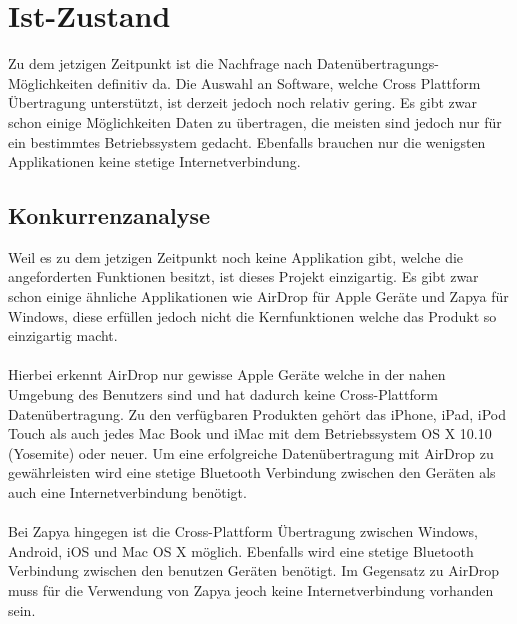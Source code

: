 \section{Ist-Zustand}
Zu dem jetzigen Zeitpunkt ist die Nachfrage nach Datenübertragungs-Möglichkeiten definitiv da. Die Auswahl an Software, welche Cross Plattform Übertragung unterstützt, ist derzeit jedoch noch relativ gering. Es gibt zwar schon einige Möglichkeiten Daten zu übertragen, die meisten sind jedoch nur für ein bestimmtes Betriebssystem gedacht. Ebenfalls brauchen nur die wenigsten Applikationen keine stetige Internetverbindung.
\subsection*{Konkurrenzanalyse}
Weil es zu dem jetzigen Zeitpunkt noch keine Applikation gibt, welche die angeforderten Funktionen besitzt, ist dieses Projekt einzigartig. Es gibt zwar schon einige ähnliche Applikationen wie AirDrop für Apple Geräte und Zapya für Windows, diese erfüllen jedoch nicht die  Kernfunktionen welche das Produkt so einzigartig macht.\\\\
Hierbei erkennt AirDrop nur gewisse Apple Geräte welche in der nahen Umgebung des Benutzers sind  und hat dadurch keine Cross-Plattform Datenübertragung. Zu den verfügbaren Produkten gehört das iPhone, iPad, iPod Touch als auch jedes Mac Book und iMac mit dem Betriebssystem OS X 10.10 (Yosemite) oder neuer. Um eine erfolgreiche Datenübertragung mit AirDrop zu gewährleisten wird eine stetige Bluetooth Verbindung zwischen den Geräten als auch eine Internetverbindung benötigt.\\\\
Bei Zapya hingegen ist die Cross-Plattform Übertragung zwischen Windows, Android, iOS und Mac OS X möglich. Ebenfalls wird eine stetige Bluetooth Verbindung zwischen den benutzen Geräten benötigt. Im Gegensatz zu AirDrop muss für die Verwendung von Zapya jeoch keine Internetverbindung vorhanden sein. 